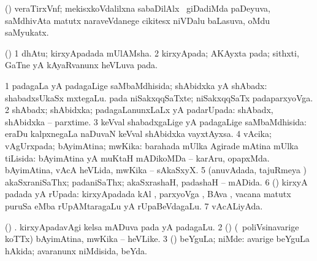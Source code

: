 {\bentry
{} 
\gl{\nA}
\expl{}
\bmng
\emng
\eentry

\bentry
{} 
\gl{\nA}
\expl{}
\bmng
 (\veYshA) veraTirxVnf; mekisxkoVdalilxna sabaDilAlx  \mo\ giDadiMda paDeyuva, saMdhivAta matutx naraveVdanege cikitesx niVDalu baLasuva, oMdu saMyukatx. 
\emng
\eentry

\bentry
{} 
\gl{\nA}
\expl{}
\bmng
 (\vAyx) 
\bnum
\num{1} dhAtu; kirxyApadada mUlAMsha. 
\num{2} kirxyApada; AKAyxta pada; sithxti, GaTne yA kAyaRvanunx heVLuva pada. 
\enum
\emng
\eentry

\bentry
{} 
\gl{\gu}
\expl{}
\bmng
\bnum
\num{1} padagaLa yA padagaLige saMbaMdhisida; shAbidxka yA shAbadx:  shabadxsUkaSx mxtegaLu.  pada niSakxqqSaTxte; niSakxqqSaTx padaparxyoVga. 
\num{2} shAbadx; shAbidxka; padagaLanunxLaLx yA padarUpada:  shAbadx, shAbidxka -- parxtime. 
\num{3} keVval shabadxgaLige yA padagaLige saMbaMdhisida:  eraDu kalpxnegaLa naDuvaN keVval shAbidxka vayxtAyxsa. 
\num{4} vAcika; vAgUrxpada; bAyimAtina; mwKika: barahada mUlka Agirade mAtina mUlka tiLisida:  bAyimAtina yA muKtaH mADikoMDa -- karAru, opapxMda.  bAyimAtina, vAcA heVLida, mwKika -- sAkaSxyX. 
\num{5} (anuvAdada, tajuRmeya \vi) akaSxraniSaThx; padaniSaThx; akaSxrashaH, padashaH -- mADida. 
\num{6} (\vAyx) kirxyA padada yA rUpada:  kirxyApadada kAl , parxyoVga , BAva , vacana  matutx puruSa  eMba rUpAMtaragaLu yA rUpaBeVdagaLu. 
\num{7} vAcALiyAda. 
\enum
\emng
\eentry

\bentry
{} 
\gl{\nA}
\expl{}
\bmng
\bnum
{} 
\banum
{} (\vAyx) . 
 kirxyApadavAgi kelsa mADuva pada yA padagaLu. 
\eanum
\numie
\num{2} (\ashi) (\kanmu\ poliVsinavarige koTTx) bAyimAtina, mwKika -- heVLike. 
\num{3} (\ashi) beYguLa; niMde:  avarige beYguLa hAkida; avaranunx niMdisida, beYda. 
\enum
\emng
\eentry

\bentry
{} 
\gl{\sakirx}
}
